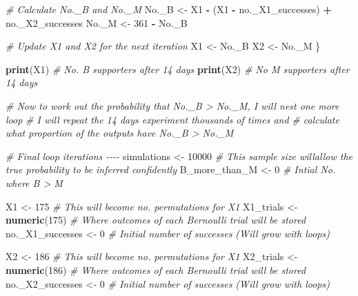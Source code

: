 \documentclass[
]{article}
\newenvironment{Shaded}{\begin{snugshade}}{\end{snugshade}}
\newcommand{\CommentTok}[1]{\textcolor[rgb]{0.56,0.35,0.01}{\textit{#1}}}
\newcommand{\DecValTok}[1]{\textcolor[rgb]{0.00,0.00,0.81}{#1}}
\newcommand{\FunctionTok}[1]{\textcolor[rgb]{0.13,0.29,0.53}{\textbf{#1}}}
\newcommand{\NormalTok}[1]{#1}
\newcommand{\OtherTok}[1]{\textcolor[rgb]{0.56,0.35,0.01}{#1}}
\newcommand{\SpecialCharTok}[1]{\textcolor[rgb]{0.81,0.36,0.00}{\textbf{#1}}}
\begin{document}
\begin{Shaded}
\begin{Highlighting}[]
  \CommentTok{\# Calculate No.\_B and No.\_M}
\NormalTok{  No.\_B }\OtherTok{\textless{}{-}}\NormalTok{ X1 }\SpecialCharTok{{-}}\NormalTok{ (X1 }\SpecialCharTok{{-}}\NormalTok{ no.\_X1\_successes) }\SpecialCharTok{+}\NormalTok{ no.\_X2\_successes}
\NormalTok{  No.\_M }\OtherTok{\textless{}{-}} \DecValTok{361} \SpecialCharTok{{-}}\NormalTok{ No.\_B}
  
  \CommentTok{\# Update X1 and X2 for the next iteration}
\NormalTok{  X1 }\OtherTok{\textless{}{-}}\NormalTok{ No.\_B}
\NormalTok{  X2 }\OtherTok{\textless{}{-}}\NormalTok{ No.\_M}
\NormalTok{\}}

\FunctionTok{print}\NormalTok{(X1)  }\CommentTok{\# No. B supporters after 14 days}
\FunctionTok{print}\NormalTok{(X2)  }\CommentTok{\# No M supporters after 14 days}














\CommentTok{\# Now to work out the probability that No.\_B \textgreater{} No.\_M, I will nest one more loop}
\CommentTok{\# I will repeat the 14 days experiment thousands of times and }
\CommentTok{\# calculate what proportion of the outputs have No.\_B \textgreater{} No.\_M}


\CommentTok{\# Final loop iterations {-}{-}{-}{-}}
\NormalTok{simulations }\OtherTok{\textless{}{-}} \DecValTok{10000}  \CommentTok{\# This sample size willallow the true probability to be inferred confidently}
\NormalTok{B\_more\_than\_M }\OtherTok{\textless{}{-}} \DecValTok{0}  \CommentTok{\# Intial No. where B \textgreater{} M}


\NormalTok{X1 }\OtherTok{\textless{}{-}} \DecValTok{175}  \CommentTok{\# This will become no. permutations for X1}
\NormalTok{X1\_trials }\OtherTok{\textless{}{-}} \FunctionTok{numeric}\NormalTok{(}\DecValTok{175}\NormalTok{)  }\CommentTok{\# Where outcomes of each Bernoulli trial will be stored}
\NormalTok{no.\_X1\_successes }\OtherTok{\textless{}{-}} \DecValTok{0}  \CommentTok{\# Initial number of successes (Will grow with loops)}

\NormalTok{X2 }\OtherTok{\textless{}{-}} \DecValTok{186}  \CommentTok{\# This will become no. permutations for X1}
\NormalTok{X2\_trials }\OtherTok{\textless{}{-}} \FunctionTok{numeric}\NormalTok{(}\DecValTok{186}\NormalTok{)  }\CommentTok{\# Where outcomes of each Bernoulli trial will be stored}
\NormalTok{no.\_X2\_successes }\OtherTok{\textless{}{-}} \DecValTok{0}  \CommentTok{\# Initial number of successes (Will grow with loops)}




\end{Highlighting}
\end{Shaded}
\end{document}
